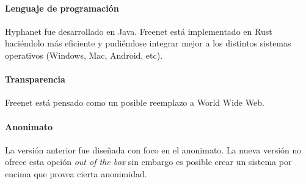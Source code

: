 \paragraph{Lenguaje de programación} Hyphanet fue desarrollado en Java. Freenet está implementado en Rust haciéndolo más eficiente y pudiéndose integrar mejor a los distintos sistemas operativos (Windows, Mac, Android, etc).

\paragraph{Transparencia} Freenet está pensado como un posible reemplazo a World Wide Web.

\paragraph{Anonimato} La versión anterior fue diseñada con foco en el anonimato. La nueva versión no ofrece esta opción \textit{out of the box} sin embargo es posible crear un sistema por encima que provea cierta anonimidad.